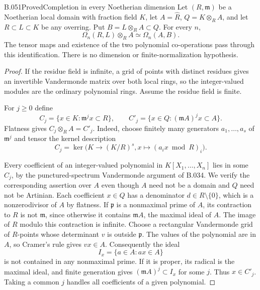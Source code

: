 \begin{saresult}{B.051}{Proved}{Completion in every Noetherian dimension}
Let $(R,\mathfrak m)$ be a Noetherian local domain with
fraction field $K$, let $A=\widehat R$, $Q=K\otimes_R A$,
and let $R\subset L\subset K$ be any overring.
Put $B=L\otimes_R A\subset Q$. For every $n$,
\[
                    \Omega_n(R,L)\otimes_R A
                         \simeq\Omega_n(A,B).              \tag{B51.1}
\]
The tensor maps and existence of the two polynomial
co-operations pass through this identification. There is
no dimension or finite-normalization hypothesis.
\end{saresult}
\begin{proof}
If the residue field is infinite, a grid of points with
distinct residues gives an invertible Vandermonde
matrix over both local rings, so the integer-valued
modules are the ordinary polynomial rings. Assume
the residue field is finite.

For $j\ge0$ define
\[
 C_j=\{x\in K:\mathfrak m^jx\subset R\},\qquad
 C'_j=\{x\in Q:(\mathfrak m A)^jx\subset A\}.
\]
Flatness gives $C_j\otimes_R A=C'_j$.
Indeed, choose finitely many generators $a_1,\ldots,a_s$
of $\mathfrak m^j$ and tensor the kernel description
\[
 C_j=\ker\bigl(K\longrightarrow(K/R)^s,
                       x\longmapsto(a_ix\bmod R)_i\bigr).
\]

Every coefficient of an integer-valued polynomial in
$K[X_1,\ldots,X_n]$ lies in some $C_j$, by the
punctured-spectrum Vandermonde argument of B.034.
We verify the corresponding assertion over $A$ even
though $A$ need not be a domain and $Q$ need not be
Artinian. Each coefficient $x\in Q$ has a denominator
$d\in R\setminus\{0\}$, which is a nonzerodivisor
of $A$ by flatness. If $\mathfrak p$ is a nonmaximal
prime of $A$, its contraction to $R$ is not
$\mathfrak m$, since otherwise it contains
$\mathfrak m A$, the maximal ideal of $A$.
The image of $R$ modulo this contraction is infinite.
Choose a rectangular Vandermonde grid of $R$-points
whose determinant $v$ is outside $\mathfrak p$.
The values of the polynomial are in $A$, so Cramer's
rule gives $vx\in A$. Consequently the ideal
\[
                         I_x=\{a\in A:ax\in A\}
\]
is not contained in any nonmaximal prime. If it is
proper, its radical is the maximal ideal, and finite
generation gives $(\mathfrak m A)^j\subset I_x$
for some $j$. Thus $x\in C'_j$.
Taking a common $j$ handles all coefficients of a
given polynomial.


\end{proof}
